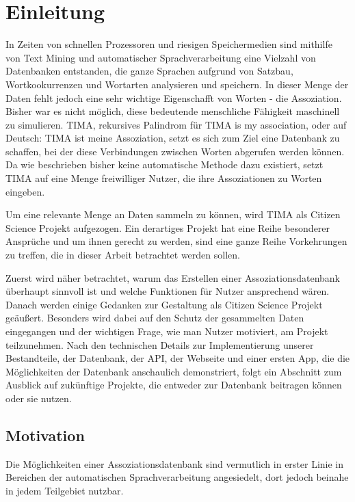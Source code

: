 \chapter{Einleitung}

In Zeiten von schnellen Prozessoren und riesigen Speichermedien sind mithilfe von Text Mining und automatischer Sprachverarbeitung eine Vielzahl von Datenbanken entstanden, die ganze Sprachen aufgrund von Satzbau, Wortkookurrenzen und Wortarten analysieren und speichern. In dieser Menge der Daten fehlt jedoch eine sehr wichtige Eigenschafft von Worten - die Assoziation. Bisher war es nicht möglich, diese bedeutende menschliche Fähigkeit maschinell zu simulieren. TIMA, rekursives Palindrom für TIMA is my association, oder auf Deutsch: TIMA ist meine Assoziation, setzt es sich zum Ziel eine Datenbank zu schaffen, bei der diese Verbindungen zwischen Worten abgerufen werden können. Da wie beschrieben bisher keine automatische Methode dazu existiert, setzt TIMA auf eine Menge freiwilliger Nutzer, die ihre Assoziationen zu Worten eingeben.

Um eine relevante Menge an Daten sammeln zu können, wird TIMA als Citizen Science Projekt aufgezogen. Ein derartiges Projekt hat eine Reihe besonderer Ansprüche und um ihnen gerecht zu werden, sind eine ganze Reihe Vorkehrungen zu treffen, die in dieser Arbeit betrachtet werden sollen.

Zuerst wird näher betrachtet, warum das Erstellen einer Assoziationsdatenbank überhaupt sinnvoll ist und welche Funktionen für Nutzer ansprechend wären. Danach werden einige Gedanken zur Gestaltung  als Citizen Science Projekt geäußert. Besonders wird dabei auf den Schutz der gesammelten Daten eingegangen und der wichtigen Frage, wie man Nutzer motiviert, am Projekt teilzunehmen. Nach den technischen Details zur Implementierung unserer Bestandteile, der Datenbank, der API, der Webseite und einer ersten App, die die Möglichkeiten der Datenbank anschaulich demonstriert, folgt ein Abschnitt zum Ausblick auf zukünftige Projekte, die entweder zur Datenbank beitragen können oder sie nutzen.



\section{Motivation}
Die Möglichkeiten einer Assoziationsdatenbank sind vermutlich in erster Linie in Bereichen der automatischen Sprachverarbeitung angesiedelt, dort jedoch beinahe in jedem Teilgebiet nutzbar.


